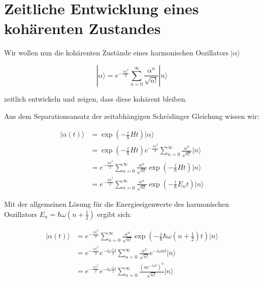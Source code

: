 


\section*{Zeitliche Entwicklung eines kohärenten Zustandes}

Wir wollen nun die kohärenten Zustände eines harmonischen Oszillators \(|\alpha\rangle \) 

\begin{equation}
  \label{eq:1}
  |\alpha\rangle =  e^{-\frac{|\alpha|^2}{2}} \sum_{n=0}^{\infty} \frac{\alpha^n}{\sqrt{n!}} |n\rangle
\end{equation}

zeitlich entwickeln und zeigen, dass diese kohärent bleiben. 

Aus dem Separationsansatz der zeitabhängigen Schrödinger Gleichung wissen wir:

\begin{align}
  \label{eq:2}
  |\alpha (t)\rangle  &= \exp\left( -\frac{i}{\hbar}Ht\right)|\alpha\rangle \\
 &= \exp\left( -\frac{i}{\hbar}Ht\right)e^{-\frac{|\alpha|^2}{2}} \sum_{n=0}^{\infty} \frac{\alpha^n}{\sqrt{n!}} |n\rangle \\
 &=e^{-\frac{|\alpha|^2}{2}}  \sum_{n=0}^{\infty} \frac{\alpha^n}{\sqrt{n!}} \exp\left( -\frac{i}{\hbar}Ht\right) |n\rangle \\
 &=  e^{-\frac{|\alpha|^2}{2}}  \sum_{n=0}^{\infty} \frac{\alpha^n}{\sqrt{n!}} \exp\left( -\frac{i}{\hbar}E_n t\right)  |n\rangle 
\end{align}

Mit der allgemeinen Lösung für die Energieeigenwerte des harmonischen Oszillators \(E_n= \hbar\omega(n+\frac{1}{2})\) ergibt sich:


\begin{align}
  |\alpha (t)\rangle  &= e^{-\frac{|\alpha|^2}{2}}  \sum_{n=0}^{\infty} \frac{\alpha^n}{\sqrt{n!}} \exp\left( -\frac{i}{\hbar}\hbar\omega(n+\frac{1}{2})  t\right)  |n\rangle \\
&= e^{-\frac{|\alpha|^2}{2}}e^{-i\omega\frac{1}{2}t}  \sum_{n=0}^{\infty} \frac{\alpha^n}{\sqrt{n!}} e^{ -i\omega n t}  |n\rangle \\
&= e^{-\frac{|\alpha|^2}{2}}e^{-i\omega\frac{1}{2}t}  \sum_{n=0}^{\infty} \frac{\left( \alpha e^{ -i\omega  t}\right)^n }{\sqrt{n!}}   |n\rangle  \label{eq:3}
\end{align}


